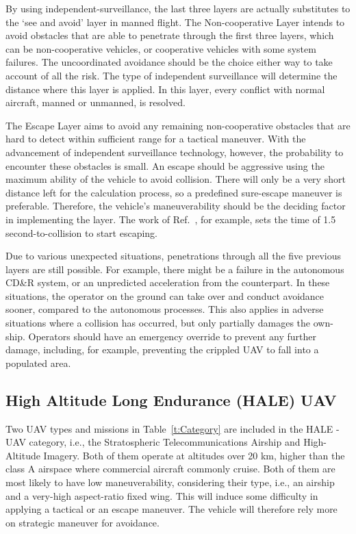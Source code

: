 By using independent-surveillance, the last three layers are actually substitutes to the `see and avoid' layer in manned flight. The Non-cooperative Layer intends to avoid obstacles that are able to penetrate through the first three layers, which can be non-cooperative vehicles, or cooperative vehicles with some system failures. The uncoordinated avoidance should be the choice either way to take account of all the risk. The type of independent surveillance will determine the distance where this layer is applied. In this layer, every conflict with normal aircraft, manned or unmanned, is resolved.

The Escape Layer aims to avoid any remaining non-cooperative obstacles that are hard to detect within sufficient range for a tactical maneuver. With the advancement of independent surveillance technology, however, the probability to encounter these obstacles is small. An escape should be aggressive using the maximum ability of the vehicle to avoid collision. There will only be a very short distance left for the calculation process, so a predefined sure-escape maneuver is preferable. Therefore, the vehicle's maneuverability should be the deciding factor in implementing the layer. The work of Ref.~\cite{barfield:00}, for example, sets the time of 1.5 second-to-collision to start escaping.

Due to various unexpected situations, penetrations through all the five previous layers are still possible. For example, there might be a failure in the autonomous CD\&R system, or an unpredicted acceleration from the counterpart. In these situations, the operator on the ground can take over and conduct avoidance sooner, compared to the autonomous processes. This also applies in adverse situations where a collision has occurred, but only partially damages the own-ship. Operators should have an emergency override to prevent any further damage, including, for example, preventing the crippled UAV to fall into a populated area.

\subsection{High Altitude Long Endurance (HALE) UAV}
Two UAV types and missions in Table~\ref{t:Category} are included in the HALE -UAV category, i.e., the Stratospheric Telecommunications Airship\cite{Colozza:03,Colozza:05} and High-Altitude Imagery\cite{Romeo:04}. Both of them operate at altitudes over 20 km, higher than the class A airspace where commercial aircraft commonly cruise. Both of them are most likely to have low maneuverability, considering their type, i.e., an airship and a very-high aspect-ratio fixed wing. This will induce some difficulty in applying a tactical or an escape maneuver. The vehicle will therefore rely more on strategic maneuver for avoidance.

